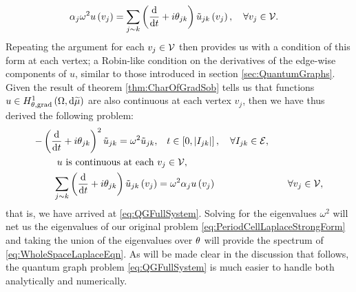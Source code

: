 \begin{align*}
	\alpha_j\omega^2 u\left( v_j \right) &= \sum_{j\sim k}\left( \dfrac{\mathrm{d}}{\mathrm{d}t} + i\theta_{jk} \right)\tilde{u}_{jk}\left( v_j \right), \quad \forall v_j \in \mathcal{V}.
\end{align*}
Repeating the argument for each $v_j\in \mathcal{V}$ then provides us with a condition of this form at each vertex; a Robin-like condition on the derivatives of the edge-wise components of $u$, similar to those introduced in section \ref{sec:QuantumGraphs}.
Given the result of theorem \ref{thm:CharOfGradSob} tells us that functions $u\in H^1_{\theta, \mathrm{grad}}\left( \Omega, \mathrm{d}\widetilde{\mu} \right)$ are also continuous at each vertex $v_j$, then we have thus derived the following problem:
\begin{align*}
	-\left( \dfrac{\mathrm{d}}{\mathrm{d}t} + i\theta_{jk} \right)^2 \tilde{u}_{jk} = \omega^2 \tilde{u}_{jk}, &\quad t\in\left[ 0,\left\lvert I_{jk} \right\rvert \right], \quad \forall I_{jk}\in \mathcal{E}, \\
	u \text{ is continuous at each } &v_j \in \mathcal{V}, \\
	\sum_{j\sim k}\left( \dfrac{\mathrm{d}}{\mathrm{d}t} + i\theta_{jk} \right)\tilde{u}_{jk}\left( v_j \right) &= \omega^2\alpha_{j}u\left( v_j \right) &\quad \forall v_j \in \mathcal{V},
\end{align*}
that is, we have arrived at \eqref{eq:QGFullSystem}.
Solving for the eigenvalues $\omega^2$ will net us the eigenvalues of our original problem \eqref{eq:PeriodCellLaplaceStrongForm} and taking the union of the eigenvalues over $\theta$ will provide the spectrum of \eqref{eq:WholeSpaceLaplaceEqn}.
As will be made clear in the discussion that follows, the quantum graph problem \eqref{eq:QGFullSystem} is much easier to handle both analytically and numerically.